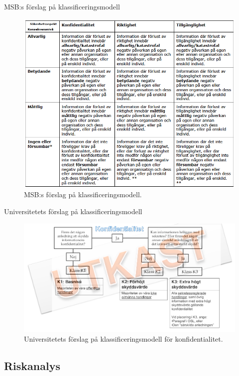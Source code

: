 \documentclass{beamer}
\begin{document}
\begin{frame}{MSB:s förslag på klassificeringsmodell}
  \begin{figure}
    \includegraphics[height=0.7\textheight]{msb-klassificering.png}
    \caption{MSB:s förslag på klassificeringsmodell.}
  \end{figure}
\end{frame}

\begin{frame}{Universitetets förslag på klassificeringsmodell}
  \begin{figure}
    \includegraphics[width=\textwidth]{miun-klassificering.png}
    \caption{Universitetets förslag på klassificeringsmodell för 
    konfidentialitet.}
  \end{figure}
\end{frame}

\subsection{Riskanalys}
\end{document}
